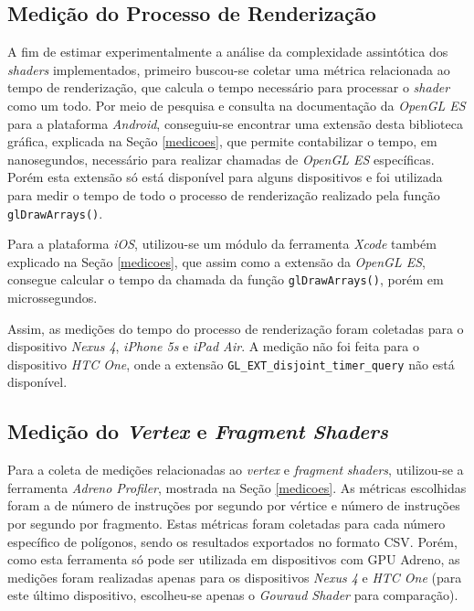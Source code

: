 \subsection{Medição do Processo de Renderização}
\label{gpu}

	A fim de estimar experimentalmente a análise da complexidade assintótica dos \textit{shaders} implementados, primeiro buscou-se coletar uma métrica relacionada ao tempo de renderização, que calcula o tempo necessário para processar o \textit{shader} como um todo. Por meio de pesquisa e consulta na documentação da \textit{OpenGL ES} para a plataforma \textit{Android}, conseguiu-se encontrar uma extensão desta biblioteca gráfica, explicada na Seção \ref{medicoes}, que permite contabilizar o tempo, em nanosegundos, necessário para realizar chamadas de \textit{OpenGL ES} específicas. Porém esta extensão só está disponível para alguns dispositivos e foi utilizada para medir o tempo de todo o processo de renderização realizado pela função \texttt{glDrawArrays()}.

	Para a plataforma \textit{iOS}, utilizou-se um módulo da ferramenta \textit{Xcode} também explicado na Seção \ref{medicoes}, que assim como a extensão da \textit{OpenGL ES}, consegue calcular o tempo da chamada da função \texttt{glDrawArrays()}, porém em microssegundos.  

	Assim, as medições do tempo do processo de renderização foram coletadas para o dispositivo \textit{Nexus 4}, \textit{iPhone 5s} e \textit{iPad Air}. A medição não foi feita para o dispositivo \textit{HTC One}, onde a extensão \texttt{GL\_EXT\_disjoint\_timer\_query} não está disponível.

\subsection{Medição do \textit{Vertex} e  \textit{Fragment Shaders}}

	Para a coleta de medições relacionadas ao \textit{vertex} e \textit{fragment} \textit{shaders}, utilizou-se a ferramenta \textit{Adreno Profiler}, mostrada na Seção \ref{medicoes}. As métricas escolhidas foram a de número de instruções por segundo por vértice e número de instruções por segundo por fragmento. Estas métricas foram coletadas para cada número específico de polígonos, sendo os resultados exportados no formato CSV. Porém, como esta ferramenta só pode ser utilizada em dispositivos com GPU Adreno, as medições foram realizadas apenas para os dispositivos \textit{Nexus 4} e \textit{HTC One} (para este último dispositivo, escolheu-se apenas o \textit{Gouraud Shader} para comparação). 

